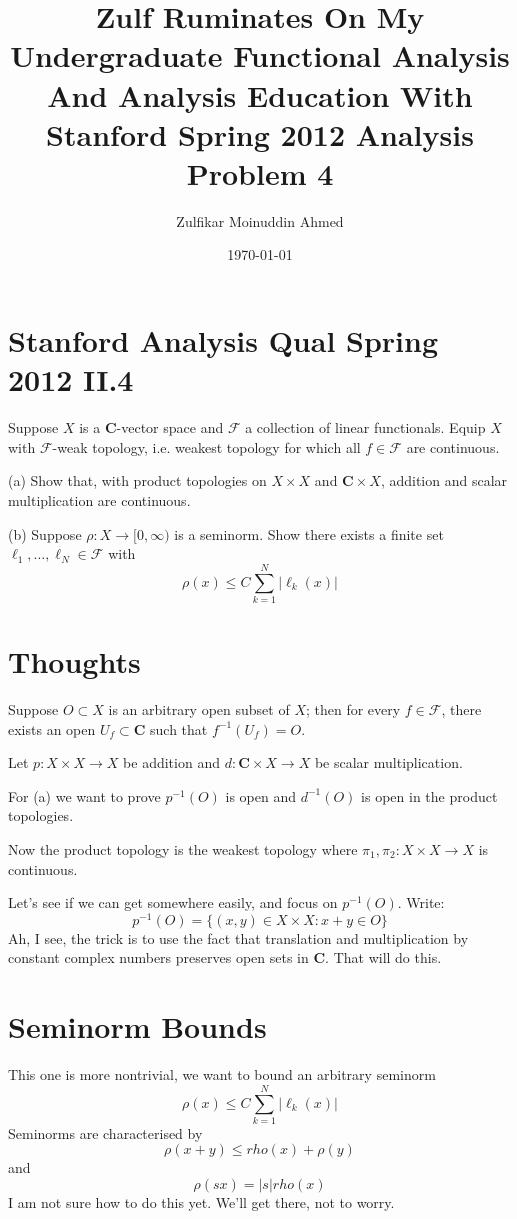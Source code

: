 \documentclass{amsart}
\title{Zulf Ruminates On My Undergraduate Functional Analysis And Analysis Education With Stanford Spring 2012 Analysis Problem 4}
\author{Zulfikar Moinuddin Ahmed}
\date{\today}
\begin{document}
\maketitle

\section{Stanford Analysis Qual Spring 2012 II.4}

Suppose $X$ is a $\mathbf{C}$-vector space and $\mathcal{F}$ a collection of linear functionals.  Equip $X$ with $\mathcal{F}$-weak topology, i.e. weakest topology for which all $f\in\mathcal{F}$ are continuous.  

(a) Show that, with product topologies on $X \times X$ and $\mathbf{C}\times X$, addition and scalar multiplication are continuous.

(b) Suppose $\rho: X \rightarrow [0,\infty)$ is a seminorm.  Show there exists  a finite set $\ell_1,\dots, \ell_N \in \mathcal{F}$ with 
\[
\rho(x) \le C \sum_{k=1}^N | \ell_k(x) |
\]

\section{Thoughts}

Suppose $O \subset X$ is an arbitrary open subset of $X$; then for every $f\in \mathcal{F}$, there exists an open $U_f \subset \mathbf{C}$ such that $f^{-1}( U_f ) = O$.  

Let $p:X\times X\rightarrow X$ be addition and $d: \mathbf{C} \times X \rightarrow X$ be scalar multiplication.

For (a) we want to prove $p^{-1}(O)$ is open and $d^{-1}(O)$ is open in the product topologies.  

Now the product topology is the weakest topology where $\pi_1,\pi_2: X \times X \rightarrow X$ is continuous.

Let's see if we can get somewhere easily, and focus on $p^{-1}(O)$. Write:
\[
p^{-1}( O ) = \{ (x,y) \in X \times X: x+y \in O \}
\]
Ah, I see,  the trick is to use the fact that translation and multiplication by constant complex numbers preserves open sets in $\mathbf{C}$.  That will do this.

\section{Seminorm Bounds}

This one is more nontrivial, we want to bound an arbitrary seminorm
\[
\rho(x) \le C \sum_{k=1}^N | \ell_k(x) |
\]
Seminorms are characterised by
\[
\rho(x+y)\le rho(x) + \rho(y)
\]
and 
\[
\rho(sx) = |s| rho(x)
\]
I am not sure how to do this yet.  We'll get there, not to worry.
\end{document}
